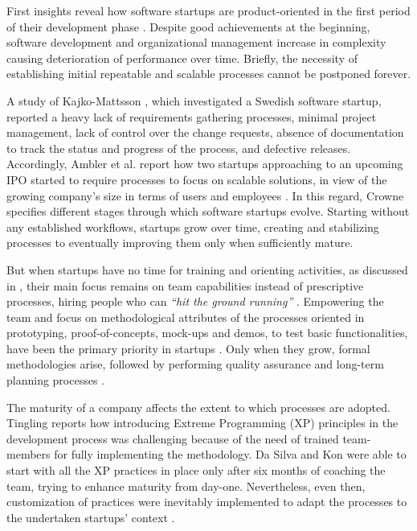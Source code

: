 \documentclass[10pt,journal,letterpaper,compsoc]{IEEEtran}
\begin{document}
First insights reveal how software startups are product-oriented in the first period of their development phase \cite{Heitlager2007}. Despite good achievements at the beginning, software development and organizational management increase in complexity \cite{1456074,Banker1998} causing  deterioration of performance over time. Briefly, the necessity of establishing initial repeatable and scalable processes cannot be postponed forever.

A study of Kajko-Mattsson \cite{Kajko-Mattsson2008}, which investigated a Swedish software startup, reported a heavy lack of requirements gathering processes, minimal project management, lack of control over the change requests, absence of documentation to track the status and progress of the process, and defective releases. Accordingly, Ambler et al. report how two startups approaching to an upcoming IPO started to require processes to focus on scalable solutions, in view of the growing company's size in terms of users and employees \cite{Ambler2002}. In this regard, Crowne \cite{Crowne2002} specifies different stages through which software startups evolve. Starting without any established workflows, startups grow over time, creating and stabilizing processes to eventually improving them only when sufficiently mature.

But when startups have no time for training and orienting activities, as discussed in \cite{Sutton2000}, their main focus remains on team capabilities instead of prescriptive processes, hiring people who can \textit{``hit the ground running''} \cite{Yoffie1999}. Empowering the team and focus on methodological attributes of the processes oriented in prototyping, proof-of-concepts, mock-ups and demos, to test basic functionalities, have been the primary priority in startups \cite{Camel1994a}. Only when they grow, formal methodologies arise, followed by performing quality assurance and long-term planning processes \cite{Yoffie1999}.

The maturity of a company affects the extent to which processes are adopted. Tingling \cite{Tingling2007} reports how introducing Extreme Programming (XP) principles \cite{Beck:2004:EPE:1076267} in the development process was challenging because of the need of trained team-members for fully implementing the methodology. Da Silva and Kon \cite{Silva2005} were able to start with all the XP practices in place only after six months of coaching the team, trying to enhance maturity from day-one. Nevertheless, even then, customization of practices were inevitably implemented to adapt the processes to the undertaken startups' context \cite{Deias}.
\end{document}
